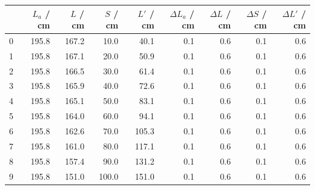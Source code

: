 \documentclass[11pt,ngerman]{scrartcl}
\begin{document}
\begin{center}
	\begin{tabular}{lrrrrrrrr}
		\toprule
		{} & $L_a$ / cm & $L$ / cm & $S$ / cm & $L'$ / cm & $\Delta L_a$ / cm & $\Delta L$ / cm & $\Delta S$ / cm & $\Delta L'$ / cm \\
		\midrule
		0  & 195.8      & 167.2    & 10.0     & 40.1      & 0.1               & 0.6             & 0.1             & 0.6              \\
		1  & 195.8      & 167.1    & 20.0     & 50.9      & 0.1               & 0.6             & 0.1             & 0.6              \\
		2  & 195.8      & 166.5    & 30.0     & 61.4      & 0.1               & 0.6             & 0.1             & 0.6              \\
		3  & 195.8      & 165.9    & 40.0     & 72.6      & 0.1               & 0.6             & 0.1             & 0.6              \\
		4  & 195.8      & 165.1    & 50.0     & 83.1      & 0.1               & 0.6             & 0.1             & 0.6              \\
		5  & 195.8      & 164.0    & 60.0     & 94.1      & 0.1               & 0.6             & 0.1             & 0.6              \\
		6  & 195.8      & 162.6    & 70.0     & 105.3     & 0.1               & 0.6             & 0.1             & 0.6              \\
		7  & 195.8      & 161.0    & 80.0     & 117.1     & 0.1               & 0.6             & 0.1             & 0.6              \\
		8  & 195.8      & 157.4    & 90.0     & 131.2     & 0.1               & 0.6             & 0.1             & 0.6              \\
		9  & 195.8      & 151.0    & 100.0    & 151.0     & 0.1               & 0.6             & 0.1             & 0.6              \\
		\bottomrule
	\end{tabular}
	\label{tab:werte_sammellinse}
\end{center}
\end{document}
